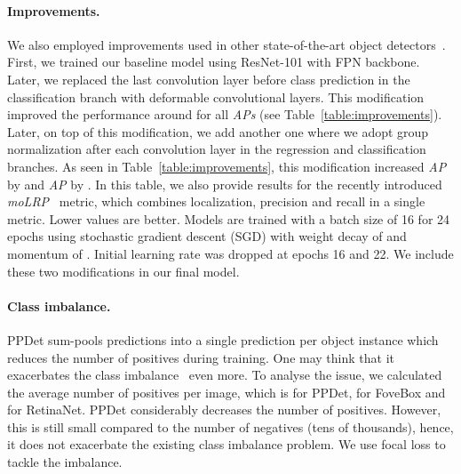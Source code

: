 \documentclass{bmvc2k}
\begin{document}
\begin{table}[h]
\centering
{}
\caption{Experiments on regression loss (RL) weight. Models were trained  on \texttt{train2017} and results were obtained on \texttt{val2017}.}
 \label{table:weight_exps}
\end{table}


\paragraph{Improvements.} We also employed improvements used in other state-of-the-art object detectors~\cite{fcos, foveabox, centernet}. First, we trained our baseline model using ResNet-101 with FPN backbone. Later, we replaced the last convolution layer before class prediction in the classification branch with deformable convolutional layers. This modification improved the performance  around  for all \textit{APs} (see Table~\ref{table:improvements}). Later, on top of this modification, we add another one where we adopt group normalization after each convolution layer in the regression and classification branches. As seen in Table~\ref{table:improvements}, this modification increased \textit{AP} by  and \textit{AP} by . In this table, we also provide results for the recently introduced \textit{moLRP}~\cite{lrp} metric, which combines localization, precision and recall in a single metric. Lower values are better. Models are trained with a batch size of 16 for 24 epochs using stochastic gradient descent (SGD) with weight decay of  and momentum of . Initial learning rate  was dropped  at epochs 16 and 22. We include these two modifications in our final model. 


\paragraph{Class imbalance.} PPDet sum-pools predictions into a single prediction per object instance which reduces the number of positives during training. One may think that it exacerbates the class imbalance~\cite{imbalance} even more. To analyse the issue, we calculated the average number of positives per image, which is  for PPDet,  for FoveBox and  for RetinaNet. PPDet considerably decreases the number of positives. However, this is still small compared to the number of negatives (tens of thousands), hence, it does not exacerbate the existing class imbalance problem. We use focal loss to tackle the imbalance.
\end{document}
